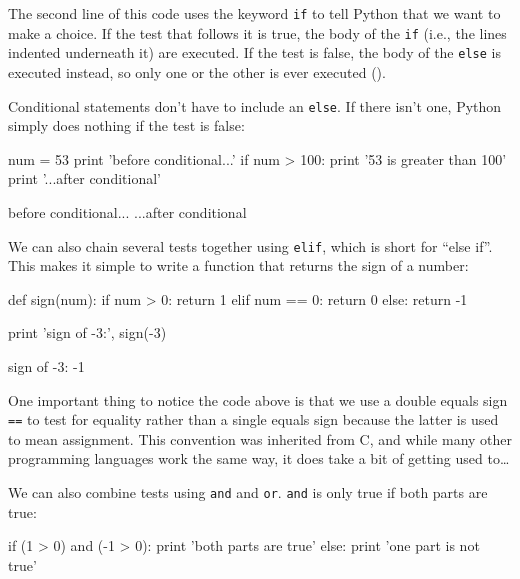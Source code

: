 \documentclass{book}
\begin{document}
The second line of this code uses the keyword \texttt{if} to tell Python
that we want to make a choice. If the test that follows it is true, the
body of the \texttt{if} (i.e., the lines indented underneath it) are
executed. If the test is false, the body of the \texttt{else} is
executed instead, so only one or the other is ever executed ().


Conditional statements don't have to include an \texttt{else}. If there
isn't one, Python simply does nothing if the test is false:

\begin{VerbIn}
num = 53
print 'before conditional...'
if num > 100:
    print '53 is greater than 100'
print '...after conditional'
\end{VerbIn}

\begin{VerbOut}
before conditional...
...after conditional
\end{VerbOut}

We can also chain several tests together using \texttt{elif}, which is
short for ``else if''. This makes it simple to write a function that
returns the sign of a number:

\begin{VerbIn}
def sign(num):
    if num > 0:
        return 1
    elif num == 0:
        return 0
    else:
        return -1

print 'sign of -3:', sign(-3)
\end{VerbIn}

\begin{VerbOut}
sign of -3: -1
\end{VerbOut}

One important thing to notice the code above is that we use a double
equals sign \texttt{==} to test for equality rather than a single equals
sign because the latter is used to mean assignment. This convention was
inherited from C, and while many other programming languages work the
same way, it does take a bit of getting used to\ldots{}

We can also combine tests using \texttt{and} and \texttt{or}.
\texttt{and} is only true if both parts are true:

\begin{VerbIn}
if (1 > 0) and (-1 > 0):
    print 'both parts are true'
else:
    print 'one part is not true'
\end{VerbIn}
\end{document}
